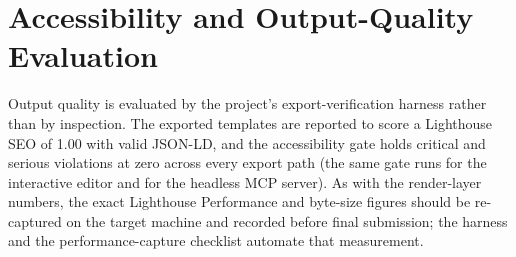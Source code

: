 \section{Accessibility and Output-Quality Evaluation}
Output quality is evaluated by the project's export-verification harness rather
than by inspection. The exported templates are reported to score a Lighthouse SEO
of 1.00 with valid JSON-LD, and the accessibility gate holds critical and serious
violations at zero across every export path (the same gate runs for the interactive
editor and for the headless MCP server). As with the render-layer numbers, the
exact Lighthouse Performance and byte-size figures should be re-captured on the
target machine and recorded before final submission; the harness and the
performance-capture checklist automate that measurement.
